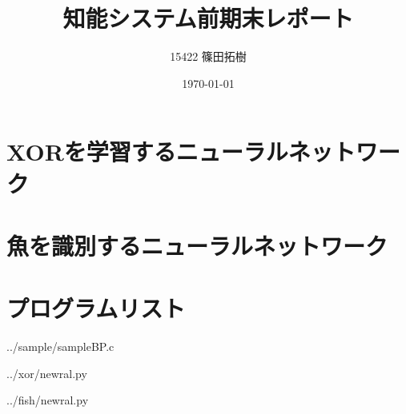 \documentclass {jsarticle}
\begin{document}
\title{知能システム前期末レポート}
\author{15422 篠田拓樹}
\date{\today}
\maketitle
\newpage
\section{XORを学習するニューラルネットワーク}
  
\section{魚を識別するニューラルネットワーク}
  
\newpage
\section{プログラムリスト}
\begin{multicols}{2}

{../sample/sampleBP.c}

{../xor/newral.py}

{../fish/newral.py}
\end{multicols}
\end{document}
